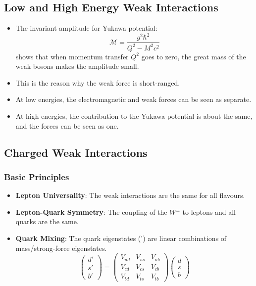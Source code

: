 \subsection{Low and High Energy Weak Interactions}
\begin{itemize}
  \item The invariant amplitude for Yukawa potential:
  \begin{equation}
    \mathcal{M} = \frac{g^2ℏ^2}{Q^2 - M^2c^2}
  \end{equation}
  shows that when momentum transfer $Q^2$ goes to zero, the great mass of the weak bosons makes the amplitude small. 
  \item This is the reason why the weak force is short-ranged.
  \item At low energies, the electromagnetic and weak forces can be seen as separate. 
  \item At high energies, the contribution to the Yukawa potential is about the same, and the forces can be seen as one.
\end{itemize}

\subsection{Charged Weak Interactions}
\subsubsection{Basic Principles}
\begin{itemize}
  \item \textbf{Lepton Universality}: The weak interactions are the same for all flavours.
  \item \textbf{Lepton-Quark Symmetry}: The coupling of the $W^{\pm}$ to leptons and all quarks are the same.
  \item \textbf{Quark Mixing}: The quark eigenstates (') are linear combinations of mass/strong-force eigenstates. 
  \begin{equation}\label{eq: quark_mixing}
    \begin{pmatrix}
      d' \\ s' \\ b'
    \end{pmatrix}
    = 
    \begin{pmatrix}
      V_{ud} & V_{us} & V_{ub} \\
      V_{cd} & V_{cs} & V_{cb} \\
      V_{td} & V_{ts} & V_{tb}
    \end{pmatrix}
    \begin{pmatrix}
      d \\ s \\ b
    \end{pmatrix}
  \end{equation}
\end{itemize}

